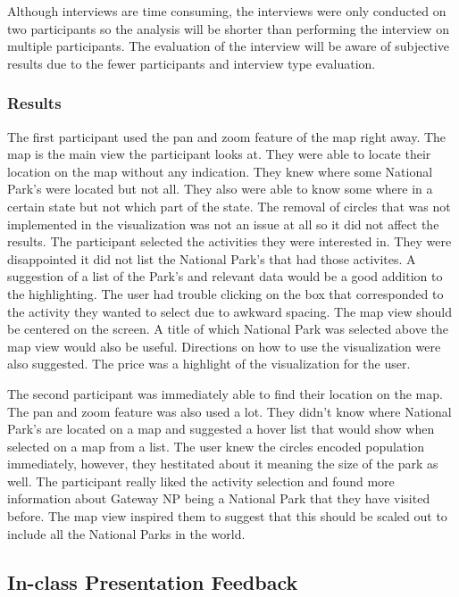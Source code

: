 Although interviews are time consuming, the interviews were only conducted on two participants so the analysis will be shorter than performing the interview on multiple participants. The evaluation of the interview will be aware of subjective results due to the fewer participants and interview type evaluation.

\subsubsection{Results}
The first participant used the pan and zoom feature of the map right away. The map is the main view the participant looks at. They were able to locate their location on the map without any indication. They knew where some National Park's were located but not all. They also were able to know some where in a certain state but not which part of the state. The removal of circles that was not implemented in the visualization was not an issue at all so it did not affect the results. The participant selected the activities they were interested in. They were disappointed it did not list the National Park's that had those activites. A suggestion of a list of the Park's and relevant data would be a good addition to the highlighting. The user had trouble clicking on the box that corresponded to the activity they wanted to select due to awkward spacing. The map view should be centered on the screen. A title of which National Park was selected above the map view would also be useful. Directions on how to use the visualization were also suggested. The price was a highlight of the visualization for the user. 

The second participant was immediately able to find their location on the map. The pan and zoom feature was also used a lot. They didn't know where National Park's are located on a map and suggested a hover list that would show when selected on a map from a list. The user knew the circles encoded population immediately, however, they hestitated about it meaning the size of the park as well. The participant really liked the activity selection and found more information about Gateway NP being a National Park that they have visited before. The map view inspired them to suggest that this should be scaled out to include all the National Parks in the world. 

\subsection{In-class Presentation Feedback}

